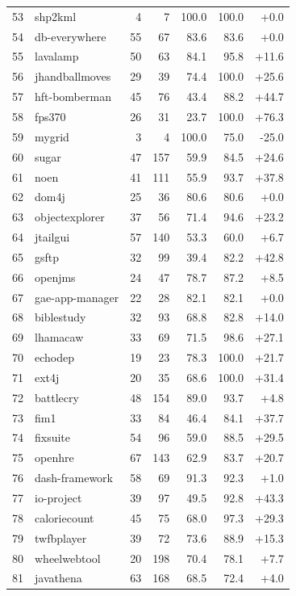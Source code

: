 \begin{table}[p]
\begin{tabular}[t]{rlrrrrr}
53 & shp2kml & 4 & 7 & 100.0 & 100.0 & +0.0 \\
54 & db-everywhere & 55 & 67 & 83.6 & 83.6 & +0.0 \\
55 & lavalamp & 50 & 63 & 84.1 & 95.8 & +11.6 \\
56 & jhandballmoves & 29 & 39 & 74.4 & 100.0 & +25.6 \\
57 & hft-bomberman & 45 & 76 & 43.4 & 88.2 & +44.7 \\
58 & fps370 & 26 & 31 & 23.7 & 100.0 & +76.3 \\
59 & mygrid & 3 & 4 & 100.0 & 75.0 & -25.0 \\
60 & sugar & 47 & 157 & 59.9 & 84.5 & +24.6 \\
61 & noen & 41 & 111 & 55.9 & 93.7 & +37.8 \\
62 & dom4j & 25 & 36 & 80.6 & 80.6 & +0.0 \\
63 & objectexplorer & 37 & 56 & 71.4 & 94.6 & +23.2 \\
64 & jtailgui & 57 & 140 & 53.3 & 60.0 & +6.7 \\
65 & gsftp & 32 & 99 & 39.4 & 82.2 & +42.8 \\
66 & openjms & 24 & 47 & 78.7 & 87.2 & +8.5 \\
67 & gae-app-manager & 22 & 28 & 82.1 & 82.1 & +0.0 \\
68 & biblestudy & 32 & 93 & 68.8 & 82.8 & +14.0 \\
69 & lhamacaw & 33 & 69 & 71.5 & 98.6 & +27.1 \\
70 & echodep & 19 & 23 & 78.3 & 100.0 & +21.7 \\
71 & ext4j & 20 & 35 & 68.6 & 100.0 & +31.4 \\
72 & battlecry & 48 & 154 & 89.0 & 93.7 & +4.8 \\
73 & fim1 & 33 & 84 & 46.4 & 84.1 & +37.7 \\
74 & fixsuite & 54 & 96 & 59.0 & 88.5 & +29.5 \\
75 & openhre & 67 & 143 & 62.9 & 83.7 & +20.7 \\
76 & dash-framework & 58 & 69 & 91.3 & 92.3 & +1.0 \\
77 & io-project & 39 & 97 & 49.5 & 92.8 & +43.3 \\
78 & caloriecount & 45 & 75 & 68.0 & 97.3 & +29.3 \\
79 & twfbplayer & 39 & 72 & 73.6 & 88.9 & +15.3 \\
80 & wheelwebtool & 20 & 198 & 70.4 & 78.1 & +7.7 \\
81 & javathena & 63 & 168 & 68.5 & 72.4 & +4.0 \\

\end{tabular}
\end{table}
